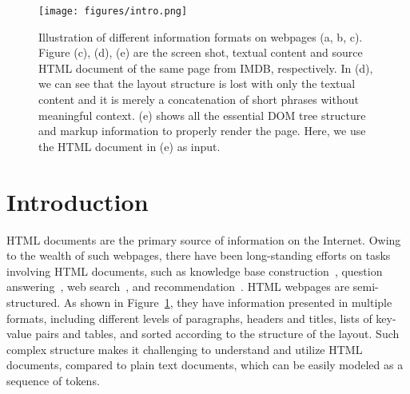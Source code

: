 \documentclass[sigconf, nonacm]{acmart}
\newcommand{\nop}[1]{}
\begin{document}

\keywords{}



\maketitle

\begin{figure}
    \centering
    \texttt{[image: figures/intro.png]}
    \vspace{-5pt}
    \caption{Illustration of different information formats on webpages (a, b, c). Figure (c), (d), (e) are the screen shot, textual content and source HTML document of the same page from IMDB, respectively. In (d), we can see that the layout structure is lost with only the textual content and it is merely a concatenation of short phrases without meaningful context. (e) shows all the essential DOM tree structure and markup information to properly render the page. Here, we use the HTML document in (e) as input. \nop{I like the diagram, but I think using diverse formats from the same (single) webpage might be clearer and can avoid confusion. The point we want to convey is not only that there are diverse formats, but that they together complement the textual context which can aid in learning better representations.}}
    \vspace{-15pt}
    \label{fig:intro}
\end{figure}
\section{Introduction}
\nop{This section needs more work especially on motivation, problem and challenges}
HTML documents are the primary source of information on the Internet. Owing to the wealth of such webpages, there have been long-standing efforts on tasks involving HTML documents, such as knowledge base construction~\cite{dong2014knowledge, wu2018fonduer}, question answering~\cite{kwiatkowski2019natural, chen2021websrc}, web search~\cite{Graupmann2004COMPASSAC, Escudeiro2009ExploringHT}, and recommendation~\cite{SnehaY2012APP}. HTML webpages are semi-structured. As shown in Figure~\ref{fig:intro}, they have information presented in multiple formats, including different levels of paragraphs, headers and titles, lists of key-value pairs and tables, and sorted according to the structure of the layout. Such complex structure makes it challenging to understand and utilize HTML documents, compared to plain text documents, which can be easily modeled as a sequence of tokens.
\end{document}
